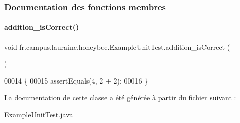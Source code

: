\subsubsection{Documentation des fonctions membres}
\mbox{\label{classfr_1_1campus_1_1laurainc_1_1honeybee_1_1_example_unit_test_a77a58b717ed25d15b8ed9c20f763ad29}} 
\paragraph{\texorpdfstring{addition\+\_\+is\+Correct()}{addition\_isCorrect()}}
{\footnotesize\ttfamily void fr.\+campus.\+laurainc.\+honeybee.\+Example\+Unit\+Test.\+addition\+\_\+is\+Correct (\begin{DoxyParamCaption}{ }\end{DoxyParamCaption})}


\begin{DoxyCode}
00014                                      \{
00015         assertEquals(4, 2 + 2);
00016     \}
\end{DoxyCode}


La documentation de cette classe a été générée à partir du fichier suivant \+:\begin{DoxyCompactItemize}
\item 
\hyperlink{_example_unit_test_8java}{Example\+Unit\+Test.\+java}\end{DoxyCompactItemize}
